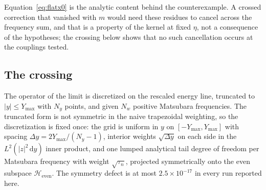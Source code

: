 \documentclass[11pt]{article}
\newcommand{\dd}{\,\mathrm d}
\theoremstyle{definition}
\theoremstyle{remark}
\begin{document}
Equation~\eqref{eq:flatx0} is the analytic content behind the counterexample. A crossed correction that vanished with $m$ would need these residues to cancel across the frequency sum, and that is a property of the kernel at fixed $\eta$, not a consequence of the hypotheses; the crossing below shows that no such cancellation occurs at the couplings tested.

\subsection{The crossing}

The operator of the limit is discretized on the rescaled energy line, truncated to $|y|\le Y_{\max}$ with $N_y$ points, and given $N_w$ positive Matsubara frequencies. The truncated form is not symmetric in the naive trapezoidal weighting, so the discretization is fixed once: the grid is uniform in $y$ on $[-Y_{\max},Y_{\max}]$ with spacing $\Delta y=2Y_{\max}/(N_y-1)$, interior weights $\sqrt{\Delta y}$ on each side in the $L^2(|z|^2\dd y)$ inner product, and one lumped analytical tail degree of freedom per Matsubara frequency with weight $\sqrt{\tau_n}$, projected symmetrically onto the even subspace $\mathcal H_{\mathrm{even}}$. The symmetry defect is at most $2.5\times10^{-17}$ in every run reported here.
\end{document}
